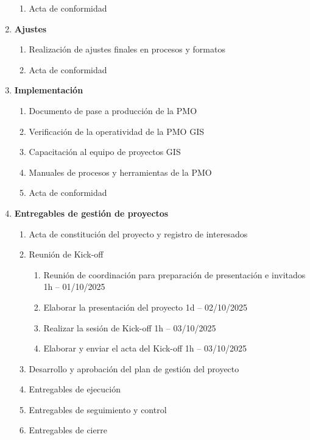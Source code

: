 \begin{enumerate}
\begin{enumerate}
    \item Acta de conformidad
  \end{enumerate}
  \item \textbf{Ajustes}
  \begin{enumerate}
    \item Realización de ajustes finales en procesos y formatos
    \item Acta de conformidad
  \end{enumerate}
  \item \textbf{Implementación}
  \begin{enumerate}
    \item Documento de pase a producción de la PMO
    \item Verificación de la operatividad de la PMO GIS
    \item Capacitación al equipo de proyectos GIS
    \item Manuales de procesos y herramientas de la PMO
    \item Acta de conformidad
  \end{enumerate}
  \item \textbf{Entregables de gestión de proyectos}
  \begin{enumerate}
    \item Acta de constitución del proyecto y registro de interesados
    \item Reunión de Kick-off
    \begin{enumerate}
      \item Reunión de coordinación para preparación de presentación e invitados \hfill 1h -- 01/10/2025
      \item Elaborar la presentación del proyecto \hfill 1d -- 02/10/2025
      \item Realizar la sesión de Kick-off \hfill 1h -- 03/10/2025
      \item Elaborar y enviar el acta del Kick-off \hfill 1h -- 03/10/2025
    \end{enumerate}
    \item Desarrollo y aprobación del plan de gestión del proyecto
    \item Entregables de ejecución
    \item Entregables de seguimiento y control
    \item Entregables de cierre
  \end{enumerate}
\end{enumerate}